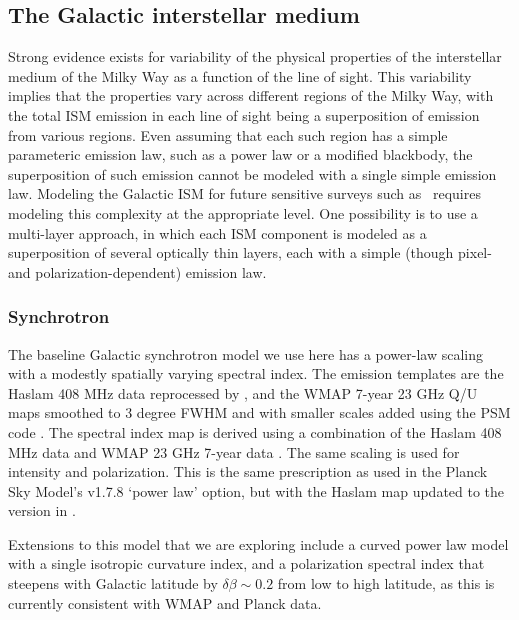 
\subsection{The Galactic interstellar medium}

Strong evidence exists for variability of the physical properties of the interstellar medium of the Milky Way as a function of the line of sight. This variability implies that the properties vary across different regions of the Milky Way, with the total ISM emission in each line of sight being a superposition of emission from various regions. Even assuming that each such region has a simple parameteric emission law, such as a power law or a modified blackbody, the superposition of such emission cannot be modeled with a single simple emission law. Modeling the Galactic ISM for future sensitive surveys such as \cmbexp\ requires  modeling  this complexity at the appropriate level. One possibility is to use a multi-layer approach, in which each ISM component is modeled as a superposition of several optically thin layers, each with a simple (though pixel- and polarization-dependent) emission law.

\subsubsection{Synchrotron}

The baseline Galactic synchrotron model we use here has a power-law scaling with a modestly spatially varying spectral index.  The emission templates are the Haslam 408 MHz data reprocessed by \cite{Remazeilles:2015hpa}, 
and the WMAP 7-year 23 GHz Q/U maps \cite{Jarosik:2010iu}
smoothed to 3 degree FWHM and with smaller scales added using the PSM code \cite{Delabrouille:2012ye}.
The spectral index map is derived using a combination of the Haslam 
408 MHz data \cite{Haslam:1981aa} and WMAP 23 GHz 7-year data \cite{MivilleDeschenes:2008hn}.
The same scaling is used for intensity and polarization.  This is the same prescription as used in the Planck Sky Model's v1.7.8 `power law' option, but with the Haslam map updated to the version in \cite{Remazeilles:2015hpa}.

Extensions to this model that we are exploring include a curved power 
law model with a single isotropic curvature index, and a polarization spectral index that steepens with Galactic latitude by $\delta \beta \sim 0.2$ from low to high latitude, as this is currently consistent with WMAP and Planck data. 

